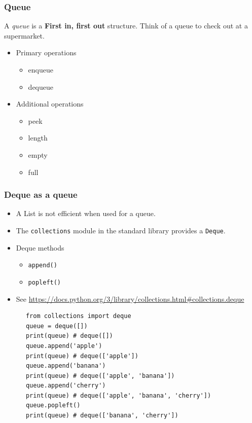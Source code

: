 \documentclass[10pt]{beamer}
\begin{document}
\begin{frame}
  \frametitle{Queue}
  A \emph{queue} is a \textbf{First in, first out} structure. Think of
  a queue to check out at a supermarket.
  
    \begin{itemize}
       \item Primary operations
          \begin{itemize}
            \item enqueue
            \item dequeue
          \end{itemize}  
	   \item Additional operations
	      \begin{itemize}
            \item peek
            \item length
            \item empty
            \item full
          \end{itemize}
     \end{itemize}
\end{frame}

\begin{frame}[fragile]
  \frametitle{Deque as a queue}
   
   \begin{itemize}
       \item A List is not efficient when used for a queue.
       \item The \texttt{collections} module in the standard library provides a \texttt{Deque}.
       \item Deque methods
          \begin{itemize}
            \item \texttt{append()}
            \item \texttt{popleft()}
          \end{itemize}  
	   \item See \url{https://docs.python.org/3/library/collections.html#collections.deque}
	\end{itemize} 
	
	\begin{verbatim}
      from collections import deque
      queue = deque([])
      print(queue) # deque([])
      queue.append('apple')
      print(queue) # deque(['apple'])
      queue.append('banana')
      print(queue) # deque(['apple', 'banana'])
      queue.append('cherry')
      print(queue) # deque(['apple', 'banana', 'cherry'])
      queue.popleft()
      print(queue) # deque(['banana', 'cherry'])
      
    \end{verbatim}  
\end{frame}
\end{document}
